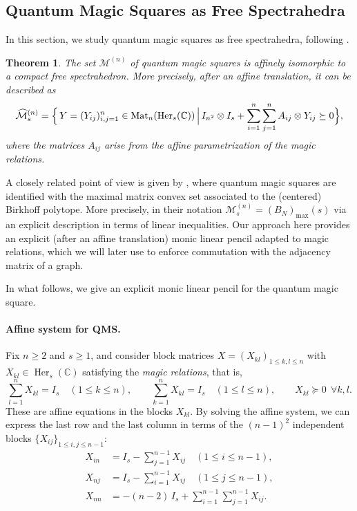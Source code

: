 \documentclass[11pt, a4paper]{article}
\theoremstyle{plain}
\newtheorem{theorem}{Theorem}[section]
\theoremstyle{definition}
\theoremstyle{remark}
\newcommand{\C}{\mathbb{C}}
\newcommand{\cMn}{\mathcal{M}^{(n)}}
\newcommand{\Her}[2][\C]{\operatorname{Her}_{#2}(#1)}
\begin{document}
\subsection{Quantum Magic Squares as Free Spectrahedra}\label{sec:free-spec}
In this section, we study quantum magic squares
as free spectrahedra, following
\cite{DDN20}.
\begin{theorem}\label{thm:Mn-free-spect}
The set \(\cMn\) of quantum magic squares is affinely isomorphic to a compact free spectrahedron.
More precisely, after an affine translation, it can be described as
\[
\widehat{\mathcal M}^{(n)}_s
=
\Bigl\{\, Y = (Y_{ij})_{i,j=1}^{n} \in \operatorname{Mat}_n(\Her{s}) \,\Big|\,
I_{n^2}\otimes I_s
+ \sum_{i=1}^{n}\sum_{j=1}^{n} A_{ij}\otimes Y_{ij}
\succeq 0
\Bigr\},
\]
where the matrices \(A_{ij}\) arise from the affine parametrization of the magic relations.
\end{theorem}


A closely related point of view is given by \cite{BNS23}, where quantum magic squares are identified with the maximal matrix convex set associated to the (centered) Birkhoff polytope.
More precisely, in their notation \(\mathcal M^{(n)}_s = (B_N)_{\max}(s)\) via an explicit description in terms of linear inequalities.
Our approach here provides an explicit (after an affine translation) monic linear pencil adapted to magic relations, which we will later use to enforce commutation with the adjacency matrix of a graph.


In what follows, we give an explicit monic linear pencil for the quantum magic square.




\paragraph{Affine system for QMS.}

Fix \(n\ge 2\) and \(s\ge 1\), and consider block matrices \(X=(X_{kl})_{1\le k,l\le n}\) with \(X_{kl}\in\Her{s}\) satisfying the \emph{magic relations}, that is,
\[
\sum_{l=1}^n X_{kl}=I_s\quad(1\le k\le n),\qquad
\sum_{k=1}^n X_{kl}=I_s\quad(1\le l\le n),\qquad
X_{kl}\succeq 0\ \ \forall k,l.
\]
These are affine equations in the blocks \(X_{kl}\).
By solving the affine system, we can express the last row and the last column in terms of the
\((n-1)^2\) independent blocks \(\{X_{ij}\}_{1\le i,j\le n-1}\):
\begin{align*}
X_{i n} &= I_s - \sum_{j=1}^{n-1} X_{ij}\quad(1\le i\le n-1),\\
X_{n j} &= I_s - \sum_{i=1}^{n-1} X_{ij}\quad(1\le j\le n-1),\\
X_{n n} &= -(n-2)\,I_s + \sum_{i=1}^{n-1}\sum_{j=1}^{n-1} X_{ij}.
\end{align*}
\end{document}
